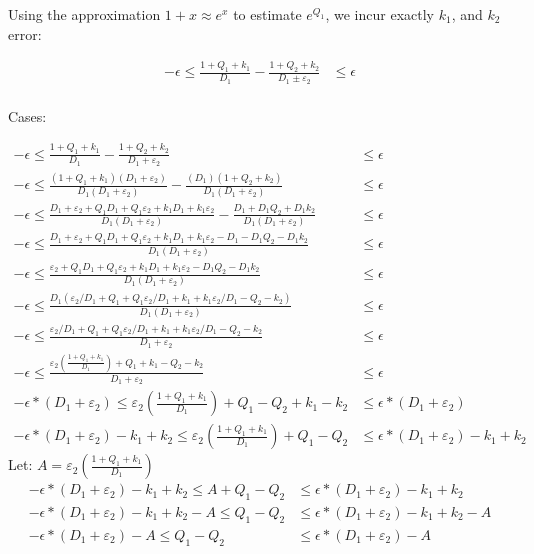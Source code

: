 \documentclass[11pt]{amsart}
\begin{document}
Using the approximation $1 + x \approx e^x$ to estimate $e^{Q_1}$, we incur exactly $k_1$, and $k_2$ error:

\begin{align*}
- \epsilon \leq \frac{1 + Q_1 + k_1}{D_1} - \frac{1 + Q_2 + k_2}{D_1 \pm \varepsilon_2} &\leq \epsilon \\
\end{align*}


Cases:

\encircle{+}

\begin{align*}
- \epsilon \leq \frac{1 + Q_1 + k_1}{D_1} - \frac{1 + Q_2 + k_2}{D_1 + \varepsilon_2} &\leq \epsilon \\
- \epsilon \leq \frac{(1 + Q_1 + k_1)(D_1 + \varepsilon_2)}{D_1(D_1 + \varepsilon_2)} - \frac{(D_1)(1 + Q_2 + k_2)}{D_1(D_1 + \varepsilon_2)} &\leq \epsilon \\
- \epsilon \leq \frac{D_1 + \varepsilon_2 + Q_1D_1 + Q_1\varepsilon_2 + k_1D_1 + k_1\varepsilon_2}{D_1(D_1 + \varepsilon_2)} - \frac{D_1 + D_1Q_2 + D_1k_2}{D_1(D_1 + \varepsilon_2)} &\leq \epsilon \\
- \epsilon \leq \frac{D_1 + \varepsilon_2 + Q_1D_1 + Q_1\varepsilon_2 + k_1D_1 + k_1\varepsilon_2 - D_1 - D_1Q_2 - D_1k_2}{D_1(D_1 + \varepsilon_2)} &\leq \epsilon \\
- \epsilon \leq \frac{\varepsilon_2 + Q_1D_1 + Q_1\varepsilon_2 + k_1D_1 + k_1\varepsilon_2 - D_1Q_2 - D_1k_2}{D_1(D_1 + \varepsilon_2)} &\leq \epsilon \\
- \epsilon \leq \frac{D_1 ( \varepsilon_2/D_1 + Q_1 + Q_1\varepsilon_2/D_1 + k_1 + k_1\varepsilon_2/D_1 - Q_2 - k_2)}{D_1(D_1 + \varepsilon_2)} &\leq \epsilon \\
- \epsilon \leq \frac{\varepsilon_2/D_1 + Q_1 + Q_1\varepsilon_2/D_1 + k_1 + k_1\varepsilon_2/D_1 - Q_2 - k_2}{D_1 + \varepsilon_2} &\leq \epsilon \\
- \epsilon \leq \frac{\varepsilon_2(\frac{1 + Q_1 + k_1}{D_1}) + Q_1 + k_1 - Q_2 - k_2}{D_1 + \varepsilon_2} &\leq \epsilon \\
- \epsilon*(D_1 + \varepsilon_2) \leq \varepsilon_2(\frac{1 + Q_1 + k_1}{D_1}) + Q_1 - Q_2 + k_1 - k_2 &\leq \epsilon*(D_1 + \varepsilon_2) \\
- \epsilon*(D_1 + \varepsilon_2) - k_1 + k_2  \leq \varepsilon_2(\frac{1 + Q_1 + k_1}{D_1}) + Q_1 - Q_2 &\leq \epsilon*(D_1 + \varepsilon_2) - k_1 + k_2
\end{align*}
Let: $A = \varepsilon_2(\frac{1 + Q_1 + k_1}{D_1})$
\begin{align*}
- \epsilon*(D_1 + \varepsilon_2) - k_1 + k_2  \leq A + Q_1 - Q_2 &\leq \epsilon*(D_1 + \varepsilon_2) - k_1 + k_2 \\
- \epsilon*(D_1 + \varepsilon_2) - k_1 + k_2 - A  \leq Q_1 - Q_2 &\leq \epsilon*(D_1 + \varepsilon_2) - k_1 + k_2 - A \\
- \epsilon*(D_1 + \varepsilon_2) - A  \leq Q_1 - Q_2 &\leq \epsilon*(D_1 + \varepsilon_2) - A
\end{align*}
\end{document}
